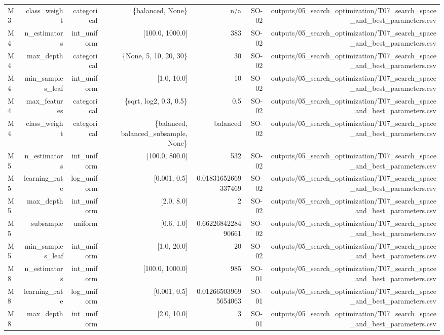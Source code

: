 \begin{table}[htbp]
\begin{tabular}{lrrrrrr}
    M3 & class\_weight & categorical & \{balanced, None\} & n/a & SO-02 & outputs/05\_search\_optimization/T07\_search\_space\_and\_best\_parameters.csv \\
    M4 & n\_estimators & int\_uniform & [100.0, 1000.0] & 383 & SO-02 & outputs/05\_search\_optimization/T07\_search\_space\_and\_best\_parameters.csv \\
    M4 & max\_depth & categorical & \{None, 5, 10, 20, 30\} & 30 & SO-02 & outputs/05\_search\_optimization/T07\_search\_space\_and\_best\_parameters.csv \\
    M4 & min\_samples\_leaf & int\_uniform & [1.0, 10.0] & 10 & SO-02 & outputs/05\_search\_optimization/T07\_search\_space\_and\_best\_parameters.csv \\
    M4 & max\_features & categorical & \{sqrt, log2, 0.3, 0.5\} & 0.5 & SO-02 & outputs/05\_search\_optimization/T07\_search\_space\_and\_best\_parameters.csv \\
    M4 & class\_weight & categorical & \{balanced, balanced\_subsample, None\} & balanced & SO-02 & outputs/05\_search\_optimization/T07\_search\_space\_and\_best\_parameters.csv \\
    M5 & n\_estimators & int\_uniform & [100.0, 800.0] & 532 & SO-02 & outputs/05\_search\_optimization/T07\_search\_space\_and\_best\_parameters.csv \\
    M5 & learning\_rate & log\_uniform & [0.001, 0.5] & 0.01831652669337469 & SO-02 & outputs/05\_search\_optimization/T07\_search\_space\_and\_best\_parameters.csv \\
    M5 & max\_depth & int\_uniform & [2.0, 8.0] & 2 & SO-02 & outputs/05\_search\_optimization/T07\_search\_space\_and\_best\_parameters.csv \\
    M5 & subsample & uniform & [0.6, 1.0] & 0.6622684228490661 & SO-02 & outputs/05\_search\_optimization/T07\_search\_space\_and\_best\_parameters.csv \\
    M5 & min\_samples\_leaf & int\_uniform & [1.0, 20.0] & 20 & SO-02 & outputs/05\_search\_optimization/T07\_search\_space\_and\_best\_parameters.csv \\
    M8 & n\_estimators & int\_uniform & [100.0, 1000.0] & 985 & SO-01 & outputs/05\_search\_optimization/T07\_search\_space\_and\_best\_parameters.csv \\
    M8 & learning\_rate & log\_uniform & [0.001, 0.5] & 0.012665039695654063 & SO-01 & outputs/05\_search\_optimization/T07\_search\_space\_and\_best\_parameters.csv \\
    M8 & max\_depth & int\_uniform & [2.0, 10.0] & 3 & SO-01 & outputs/05\_search\_optimization/T07\_search\_space\_and\_best\_parameters.csv \\

\end{tabular}
\end{table}
